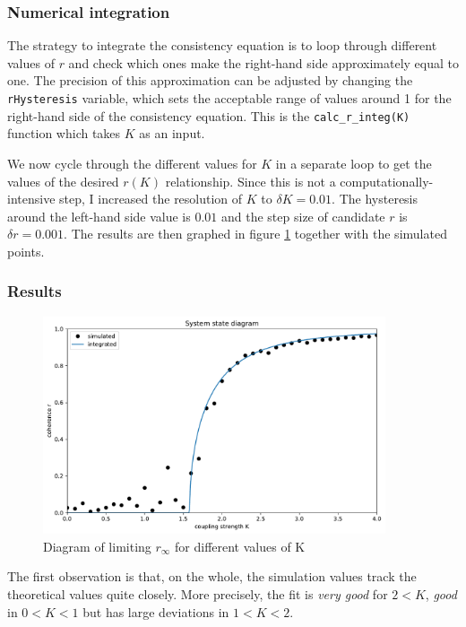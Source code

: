 \documentclass[11pt,a4paper]{article}
\newcommand{\code}[1]{\texttt{#1}}
\begin{document}
\subsubsection{Numerical integration}
The strategy to integrate the consistency equation is to loop through different values of $r$ and check which ones make the right-hand side approximately equal to one. 
The precision of this approximation can be adjusted by changing the \code{rHysteresis} variable, which sets the acceptable range of values around 1 for the right-hand side of the consistency equation.
This is the \code{calc\_r\_integ(K)} function which takes $K$ as an input.

We now cycle through the different values for $K$ in a separate loop to get the values of the desired $r(K)$ relationship.
Since this is not a computationally-intensive step, I increased the resolution of $K$ to $\delta K = 0.01$. 
The hysteresis around the left-hand side value is $0.01$ and the step size of candidate $r$ is $\delta r = 0.001$.
The results are then graphed in figure \ref{1} together with the simulated points.




\subsubsection{Results}

\begin{figure}[H]
	\centering
	\includegraphics[width=0.9\textwidth]{graphics/1_K-vs-r_omegaDistr=normal_N=1000_1611577031.pdf}
	\caption{Diagram of limiting $r_\infty$ for different values of K}
	\label{1}
\end{figure}


The first observation is that, on the whole, the simulation values track the theoretical values quite closely. 
More precisely, the fit is \textit{very good} for $2<K$, \textit{good} in $0<K<1$ but has large deviations in $1<K<2$. 
\end{document}
